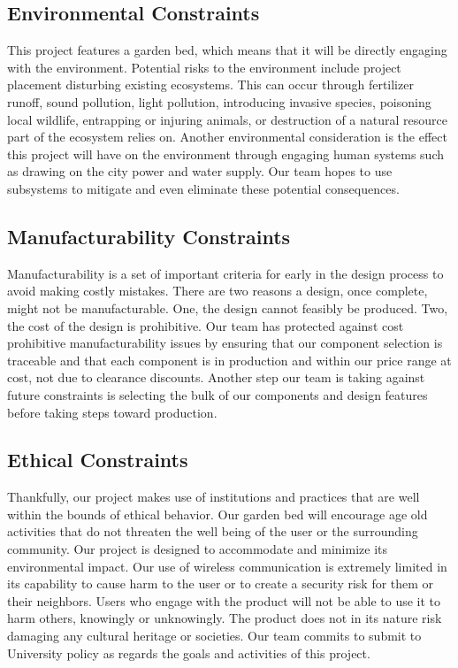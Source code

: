 \subsection{Environmental Constraints}
This project features a garden bed, which means that it will be directly engaging with the environment. Potential risks to the environment include project placement disturbing existing ecosystems. This can occur through fertilizer runoff, sound pollution, light pollution, introducing invasive species, poisoning local wildlife, entrapping or injuring animals, or destruction of a natural resource part of the ecosystem relies on.
Another environmental consideration is the effect this project will have on the environment through engaging human systems such as drawing on the city power and water supply. Our team hopes to use subsystems to mitigate and even eliminate these potential consequences.


\subsection{Manufacturability Constraints}
Manufacturability is a set of important criteria for early in the design process to avoid making costly mistakes. There are two reasons a design, once complete, might not be manufacturable. One, the design cannot feasibly be produced. Two, the cost of the design is prohibitive. 
Our team has protected against cost prohibitive manufacturability issues by ensuring that our component selection is traceable and that each component is in production and within our price range at cost, not due to clearance discounts. Another step our team is taking against future constraints is selecting the bulk of our components and design features before taking steps toward production.  

\subsection{Ethical Constraints}
Thankfully, our project makes use of institutions and practices that are well within the bounds of ethical behavior. Our garden bed will encourage age old activities that do not threaten the well being of the user or the surrounding community. Our project is designed to accommodate and minimize its environmental impact. Our use of wireless communication is extremely limited in its capability to cause harm to the user or to create a security risk for them or their neighbors. Users who engage with the product will not be able to use it to harm others, knowingly or unknowingly. The product does not in its nature risk damaging any cultural heritage or societies. Our team commits to submit to University policy as regards the goals and activities of this project.

